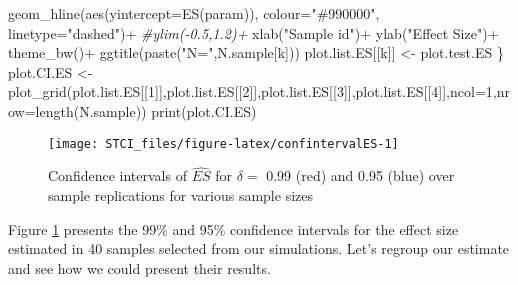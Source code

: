 \documentclass[
]{book}
\newenvironment{Shaded}{\begin{snugshade}}{\end{snugshade}}
\newcommand{\AttributeTok}[1]{\textcolor[rgb]{0.77,0.63,0.00}{#1}}
\newcommand{\CommentTok}[1]{\textcolor[rgb]{0.56,0.35,0.01}{\textit{#1}}}
\newcommand{\DecValTok}[1]{\textcolor[rgb]{0.00,0.00,0.81}{#1}}
\newcommand{\FunctionTok}[1]{\textcolor[rgb]{0.00,0.00,0.00}{#1}}
\newcommand{\NormalTok}[1]{#1}
\newcommand{\OtherTok}[1]{\textcolor[rgb]{0.56,0.35,0.01}{#1}}
\newcommand{\SpecialCharTok}[1]{\textcolor[rgb]{0.00,0.00,0.00}{#1}}
\newcommand{\StringTok}[1]{\textcolor[rgb]{0.31,0.60,0.02}{#1}}
\theoremstyle{definition}
\theoremstyle{definition}
\theoremstyle{definition}
\theoremstyle{definition}
\theoremstyle{remark}
\begin{document}
\begin{Shaded}
\begin{Highlighting}[]
      \FunctionTok{geom\_hline}\NormalTok{(}\FunctionTok{aes}\NormalTok{(}\AttributeTok{yintercept=}\FunctionTok{ES}\NormalTok{(param)), }\AttributeTok{colour=}\StringTok{"\#990000"}\NormalTok{, }\AttributeTok{linetype=}\StringTok{"dashed"}\NormalTok{)}\SpecialCharTok{+}
      \CommentTok{\#ylim({-}0.5,1.2)+}
      \FunctionTok{xlab}\NormalTok{(}\StringTok{"Sample id"}\NormalTok{)}\SpecialCharTok{+}
      \FunctionTok{ylab}\NormalTok{(}\StringTok{"Effect Size"}\NormalTok{)}\SpecialCharTok{+}
      \FunctionTok{theme\_bw}\NormalTok{()}\SpecialCharTok{+}
      \FunctionTok{ggtitle}\NormalTok{(}\FunctionTok{paste}\NormalTok{(}\StringTok{"N="}\NormalTok{,N.sample[k]))}
\NormalTok{  plot.list.ES[[k]] }\OtherTok{\textless{}{-}}\NormalTok{ plot.test.ES }
\NormalTok{\}}
\NormalTok{plot.CI.ES }\OtherTok{\textless{}{-}} \FunctionTok{plot\_grid}\NormalTok{(plot.list.ES[[}\DecValTok{1}\NormalTok{]],plot.list.ES[[}\DecValTok{2}\NormalTok{]],plot.list.ES[[}\DecValTok{3}\NormalTok{]],plot.list.ES[[}\DecValTok{4}\NormalTok{]],}\AttributeTok{ncol=}\DecValTok{1}\NormalTok{,}\AttributeTok{nrow=}\FunctionTok{length}\NormalTok{(N.sample))}
\FunctionTok{print}\NormalTok{(plot.CI.ES)}
\end{Highlighting}
\end{Shaded}

\begin{figure}[htbp]

{\centering \texttt{[image: STCI\_files/figure-latex/confintervalES-1]} 

}

\caption{Confidence intervals of $\hat{ES}$ for $\delta=$ 0.99 (red) and 0.95 (blue) over sample replications for various sample sizes}\label{fig:confintervalES}
\end{figure}

Figure \ref{fig:confintervalES} presents the 99\% and 95\% confidence intervals for the effect size estimated in 40 samples selected from our simulations.
Let's regroup our estimate and see how we could present their results.
\end{document}
